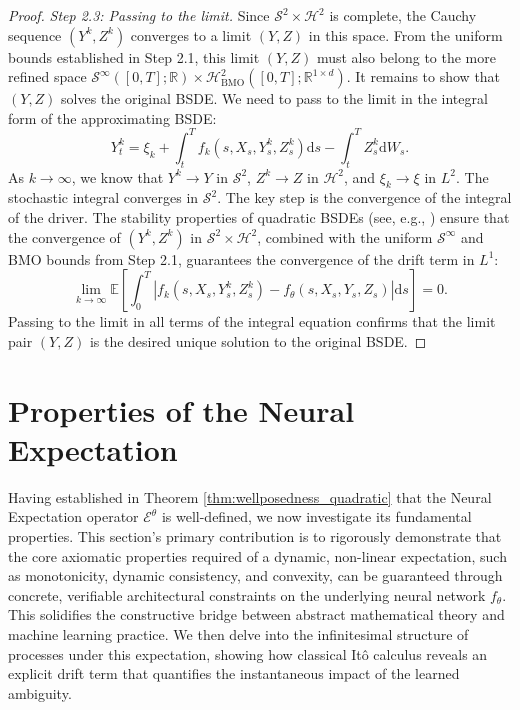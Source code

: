 \documentclass[qian]{imsart}
\newcommand{\R}{\mathbb{R}}
\newcommand{\E}{\mathbb{E}}
\newcommand{\cEneutheta}{\mathcal{E}^{\theta}}
\newcommand{\dd}{\mathrm{d}}
\newcommand{\abs}[1]{\left\lvert#1\right\rvert}
\theoremstyle{plain}
\theoremstyle{definition}
\begin{document}
\begin{proof}
\emph{Step 2.3: Passing to the limit.}
Since $\mathcal{S}^2 \times \mathcal{H}^2$ is complete, the Cauchy sequence $(Y^k,Z^k)$ converges to a limit $(Y,Z)$ in this space. From the uniform bounds established in Step 2.1, this limit $(Y,Z)$ must also belong to the more refined space $\mathcal{S}^{\infty}([0,T]; \R) \times \mathcal{H}^2_{\mathrm{BMO}}([0,T]; \R^{1 \times d})$.
It remains to show that $(Y,Z)$ solves the original BSDE. We need to pass to the limit in the integral form of the approximating BSDE:
\[ Y^k_t = \xi_k + \int_t^T f_k(s, X_s, Y^k_s, Z^k_s) \dd s - \int_t^T Z^k_s \dd W_s. \]
As $k \to \infty$, we know that $Y^k \to Y$ in $\mathcal{S}^2$, $Z^k \to Z$ in $\mathcal{H}^2$, and $\xi_k \to \xi$ in $L^2$. The stochastic integral converges in $\mathcal{S}^2$. The key step is the convergence of the integral of the driver. The stability properties of quadratic BSDEs (see, e.g., \cite{BriandEtAl2003}) ensure that the convergence of $(Y^k, Z^k)$ in $\mathcal{S}^2 \times \mathcal{H}^2$, combined with the uniform $\mathcal{S}^\infty$ and BMO bounds from Step 2.1, guarantees the convergence of the drift term in $L^1$:
\[ \lim_{k\to\infty} \E\left[\int_0^T \abs{f_k(s, X_s, Y^k_s, Z^k_s) - f_\theta(s, X_s, Y_s, Z_s)} \dd s\right] = 0. \]
Passing to the limit in all terms of the integral equation confirms that the limit pair $(Y,Z)$ is the desired unique solution to the original BSDE.
\end{proof}


\section{Properties of the Neural Expectation}
\label{sec:axiomatic_properties}

Having established in Theorem \ref{thm:wellposedness_quadratic} that the Neural Expectation operator $\cEneutheta$ is well-defined, we now investigate its fundamental properties. This section's primary contribution is to rigorously demonstrate that the core axiomatic properties required of a dynamic, non-linear expectation, such as monotonicity, dynamic consistency, and convexity, can be guaranteed through concrete, verifiable architectural constraints on the underlying neural network $f_\theta$. This solidifies the constructive bridge between abstract mathematical theory and machine learning practice. We then delve into the infinitesimal structure of processes under this expectation, showing how classical Itô calculus reveals an explicit drift term that quantifies the instantaneous impact of the learned ambiguity.
\end{document}
